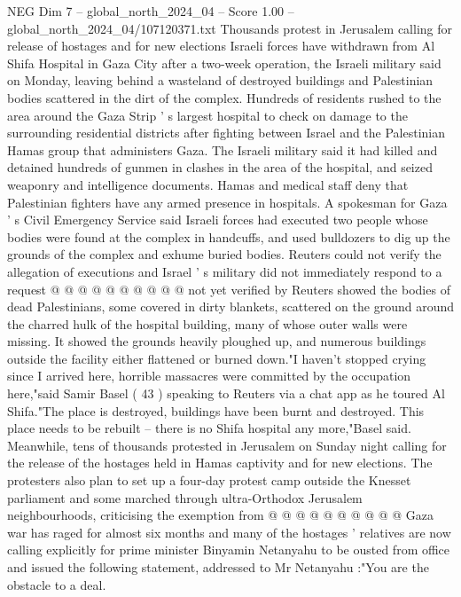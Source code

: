 \begin{textsample}{NEG Dim 7 – global\_north\_2024\_04 – Score 1.00 – global\_north\_2024\_04/107120371.txt}  \label{ex:f7_neg_390}
Thousands protest in Jerusalem calling for release of hostages and for new elections Israeli forces have withdrawn from Al Shifa Hospital in Gaza City after a two-week operation, the Israeli military said on Monday, leaving behind a wasteland of destroyed buildings and Palestinian bodies scattered in the dirt of the complex.
Hundreds of residents rushed to the area around the Gaza Strip ' s largest hospital to check on damage to the surrounding residential districts after fighting between Israel and the Palestinian Hamas group that administers Gaza.
The Israeli military said it had killed and detained hundreds of gunmen in clashes in the area of the hospital, and seized weaponry and intelligence documents.
Hamas and medical staff deny that Palestinian fighters have any armed presence in hospitals.
A spokesman for Gaza ' s Civil Emergency Service said Israeli forces had executed two people whose bodies were found at the complex in handcuffs, and used bulldozers to dig up the grounds of the complex and exhume buried bodies.
Reuters could not verify the allegation of executions and Israel ' s military did not immediately respond to a request @ @ @ @ @ @ @ @ @ @ not yet verified by Reuters showed the bodies of dead Palestinians, some covered in dirty blankets, scattered on the ground around the charred hulk of the hospital building, many of whose outer walls were missing.
It showed the grounds heavily ploughed up, and numerous buildings outside the facility either flattened or burned down."I haven't stopped crying since I arrived here, horrible massacres were committed by the occupation here,"said Samir Basel ( 43 ) speaking to Reuters via a chat app as he toured Al Shifa."The place is destroyed, buildings have been burnt and destroyed.
This place needs to be rebuilt -- there is no Shifa hospital any more,"Basel said.
Meanwhile, tens of thousands protested in Jerusalem on Sunday night calling for the release of the hostages held in Hamas captivity and for new elections.
The protesters also plan to set up a four-day protest camp outside the Knesset parliament and some marched through ultra-Orthodox Jerusalem neighbourhoods, criticising the exemption from @ @ @ @ @ @ @ @ @ @ Gaza war has raged for almost six months and many of the hostages ' relatives are now calling explicitly for prime minister Binyamin Netanyahu to be ousted from office and issued the following statement, addressed to Mr Netanyahu :"You are the obstacle to a deal.

\end{textsample}
